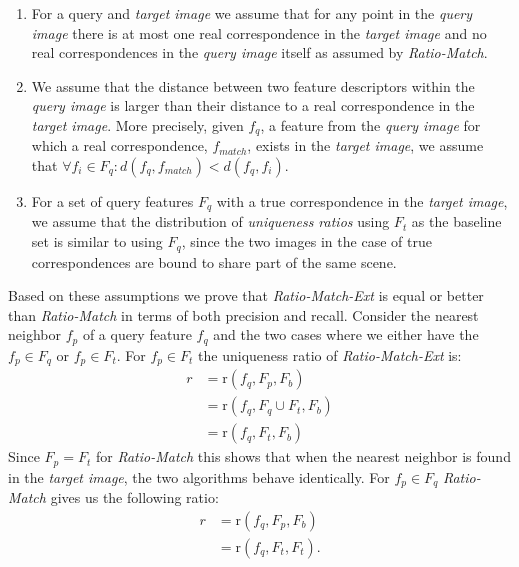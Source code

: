 \documentclass[review]{elsarticle}
\begin{document}
\begin{enumerate}
    \item{For a query and \emph{target image} we assume that for any point in 
        the \emph{query image} there is at most one real correspondence in the 
    \emph{target image} and no real correspondences in the \emph{query image} itself 
as assumed by \emph{Ratio-Match}.}
    \item{We assume that the distance between two feature descriptors within the \emph{query image} is larger than their distance to a real correspondence in the \emph{target image}.  More precisely, given $f_q$, a feature from the \emph{query image} for which a real correspondence, $f_{match}$, exists in the \emph{target image}, we assume that $\forall f_i \in F_{q}: d(f_q,f_{match}) < d(f_q, f_i)$.}
     \item{For a set of query features $F_{q}$ with a true 
             correspondence in the \emph{target image}, we assume that 
             the distribution of \emph{uniqueness ratios} using $F_{t}$ as 
             the baseline set is similar to using $F_{q}$, since the 
         two images in the case of true correspondences are bound 
     to share part of the same scene.}
    \end{enumerate}

Based on these assumptions we prove that \emph{Ratio-Match-Ext} is equal
or better than \emph{Ratio-Match} in terms of both precision and recall.  Consider the nearest neighbor $f_{p}$ of a query feature $f_{q}$ and the two cases where we either have the $f_{p} \in F_{q}$ or $f_{p} \in F_{t}$. For $f_{p} \in F_{t}$ the uniqueness ratio of \emph{Ratio-Match-Ext} is:
\begin{align*}
    r &= \text{r}(f_{q}, F_{p}, F_{b}) \\
        &= \text{r}(f_{q}, F_{q} \cup F_{t}, F_{b})\\
        &= \text{r}(f_{q}, F_{t}, F_{b})
\end{align*}
Since $F_{p} = F_{t}$ for \emph{Ratio-Match} this shows that when the nearest neighbor is found in the \emph{target image}, the two algorithms behave identically. For $f_{p} \in F_{q}$ \emph{Ratio-Match} gives us the following ratio:
\begin{align*}
    r &= \text{r}(f_{q}, F_{p}, F_{b}) \\
        &= \text{r}(f_{q}, F_{t}, F_{t}).
\end{align*}
\end{document}
